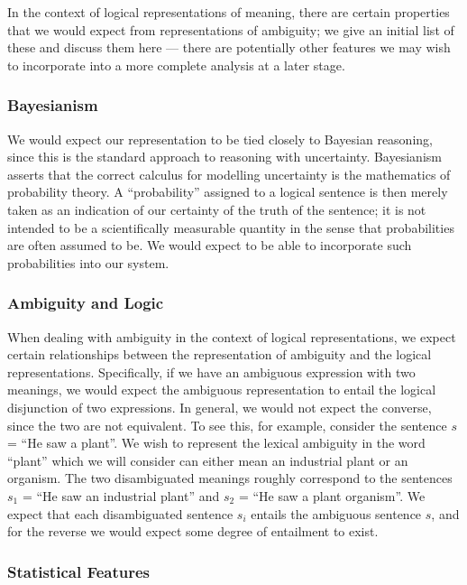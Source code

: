 In the context of logical representations of meaning, there are certain properties that we would expect from representations of ambiguity; we give an initial list of these and discuss them here --- there are potentially other features we may wish to incorporate into a more complete analysis at a later stage.



\subsubsection*{Bayesianism}

We would expect our representation to be tied closely to Bayesian reasoning, since this is the standard approach to reasoning with uncertainty. Bayesianism asserts that the correct calculus for modelling uncertainty is the mathematics of probability theory. A ``probability'' assigned to a logical sentence is then merely taken as an indication of our certainty of the truth of the sentence; it is not intended to be a scientifically measurable quantity in the sense that probabilities are often assumed to be. We would expect to be able to incorporate such probabilities into our system.


\subsubsection*{Ambiguity and Logic}

When dealing with ambiguity in the context of logical representations, we expect certain relationships between the representation of ambiguity and the logical representations. Specifically, if we have an ambiguous expression with two meanings, we would expect the ambiguous representation to entail the logical disjunction of two expressions. In general, we would not expect the converse, since the two are not equivalent. To see this, for example, consider the sentence $s$ = ``He saw a plant''. We wish to represent the lexical ambiguity in the word ``plant'' which we will consider can either mean an industrial plant or an organism. The two disambiguated meanings roughly correspond to the sentences $s_1$ = ``He saw an industrial plant'' and $s_2$ = ``He saw a plant organism''. We expect that each disambiguated sentence $s_i$ entails the ambiguous sentence $s$, and for the reverse we would expect some degree of entailment to exist. 

\subsubsection*{Statistical Features}

